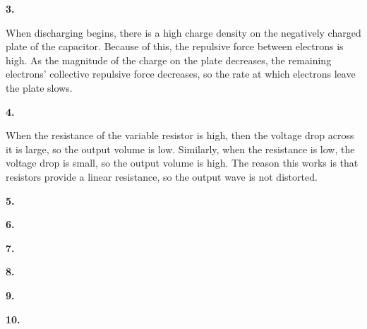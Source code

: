 \documentclass{article}
\begin{document}
\newpage\noindent\textbf{3.}

    When discharging begins, there is a high charge density on the negatively charged plate of the capacitor.
    Because of this, the repulsive force between electrons is high.
    As the magnitude of the charge on the plate decreases, the remaining electrons' collective repulsive force decreases, so the rate at which electrons leave the plate slows.

\newpage\noindent\textbf{4.}

    When the resistance of the variable resistor is high, then the voltage drop across it is large, so the output volume is low.
    Similarly, when the resistance is low, the voltage drop is small, so the output volume is high.
    The reason this works is that resistors provide a linear resistance, so the output wave is not distorted.

\newpage\noindent\textbf{5.}

    

\newpage\noindent\textbf{6.}

\newpage\noindent\textbf{7.}
        
\newpage\noindent\textbf{8.}

\newpage\noindent\textbf{9.}

\newpage\noindent\textbf{10.}
\end{document}

